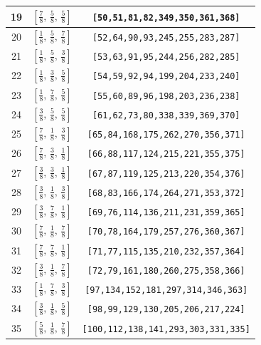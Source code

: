 \documentclass[fleqn,8pt]{jsarticle}
\begin{document}
\begin{longtable}{ccc}
19 & $\left[ \frac{7}{8},\, \frac{5}{8},\, \frac{5}{8} \right]$ & {\tt [50,51,81,82,349,350,361,368]} \\ \hline
20 & $\left[ \frac{1}{8},\, \frac{5}{8},\, \frac{7}{8} \right]$ & {\tt [52,64,90,93,245,255,283,287]} \\ \hline
21 & $\left[ \frac{1}{8},\, \frac{5}{8},\, \frac{3}{8} \right]$ & {\tt [53,63,91,95,244,256,282,285]} \\ \hline
22 & $\left[ \frac{1}{8},\, \frac{3}{8},\, \frac{5}{8} \right]$ & {\tt [54,59,92,94,199,204,233,240]} \\ \hline
23 & $\left[ \frac{1}{8},\, \frac{7}{8},\, \frac{5}{8} \right]$ & {\tt [55,60,89,96,198,203,236,238]} \\ \hline
24 & $\left[ \frac{3}{8},\, \frac{5}{8},\, \frac{5}{8} \right]$ & {\tt [61,62,73,80,338,339,369,370]} \\ \hline
25 & $\left[ \frac{7}{8},\, \frac{1}{8},\, \frac{3}{8} \right]$ & {\tt [65,84,168,175,262,270,356,371]} \\ \hline
26 & $\left[ \frac{7}{8},\, \frac{3}{8},\, \frac{1}{8} \right]$ & {\tt [66,88,117,124,215,221,355,375]} \\ \hline
27 & $\left[ \frac{3}{8},\, \frac{3}{8},\, \frac{1}{8} \right]$ & {\tt [67,87,119,125,213,220,354,376]} \\ \hline
28 & $\left[ \frac{3}{8},\, \frac{1}{8},\, \frac{3}{8} \right]$ & {\tt [68,83,166,174,264,271,353,372]} \\ \hline
29 & $\left[ \frac{3}{8},\, \frac{7}{8},\, \frac{1}{8} \right]$ & {\tt [69,76,114,136,211,231,359,365]} \\ \hline
30 & $\left[ \frac{7}{8},\, \frac{1}{8},\, \frac{7}{8} \right]$ & {\tt [70,78,164,179,257,276,360,367]} \\ \hline
31 & $\left[ \frac{7}{8},\, \frac{7}{8},\, \frac{1}{8} \right]$ & {\tt [71,77,115,135,210,232,357,364]} \\ \hline
32 & $\left[ \frac{3}{8},\, \frac{1}{8},\, \frac{7}{8} \right]$ & {\tt [72,79,161,180,260,275,358,366]} \\ \hline
33 & $\left[ \frac{1}{8},\, \frac{7}{8},\, \frac{3}{8} \right]$ & {\tt [97,134,152,181,297,314,346,363]} \\ \hline
34 & $\left[ \frac{3}{8},\, \frac{1}{8},\, \frac{5}{8} \right]$ & {\tt [98,99,129,130,205,206,217,224]} \\ \hline
35 & $\left[ \frac{5}{8},\, \frac{1}{8},\, \frac{7}{8} \right]$ & {\tt [100,112,138,141,293,303,331,335]} \\ \hline

\end{longtable}
\end{document}
